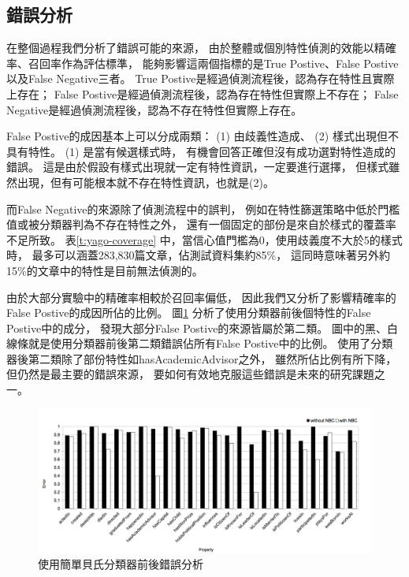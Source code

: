 \subsection{錯誤分析}

在整個過程我們分析了錯誤可能的來源，
由於整體或個別特性偵測的效能以精確率、召回率作為評估標準，
能夠影響這兩個指標的是True Postive、False Postive以及False Negative三者。
True Postive是經過偵測流程後，認為存在特性且實際上存在；
False Postive是經過偵測流程後，認為存在特性但實際上不存在；
False Negative是經過偵測流程後，認為不存在特性但實際上存在。

False Postive的成因基本上可以分成兩類：
(1) 由歧義性造成、 (2) 樣式出現但不具有特性。
(1) 是當有候選樣式時，
有機會回答正確但沒有成功選對特性造成的錯誤。
這是由於假設有樣式出現就一定有特性資訊，一定要進行選擇，
但樣式雖然出現，但有可能根本就不存在特性資訊，也就是(2)。

而False Negative的來源除了偵測流程中的誤判，
例如在特性篩選策略中低於門檻值或被分類器判為不存在特性之外，
還有一個固定的部份是來自於樣式的覆蓋率不足所致。
表\ref{t:yago-coverage} 中，當信心值門檻為0，使用歧義度不大於5的樣式時，
最多可以涵蓋283,830篇文章，佔測試資料集約85\%，
這同時意味著另外約15\%的文章中的特性是目前無法偵測的。

由於大部分實驗中的精確率相較於召回率偏低，
因此我們又分析了影響精確率的False Postive的成因所佔的比例。
圖\ref{i:error} 分析了使用分類器前後個特性的False Postive中的成分，
發現大部分False Postive的來源皆屬於第二類。
圖中的黑、白線條就是使用分類器前後第二類錯誤佔所有False Postive中的比例。
使用了分類器後第二類除了部份特性如hasAcademicAdvisor之外，
雖然所佔比例有所下降，但仍然是最主要的錯誤來源，
要如何有效地克服這些錯誤是未來的研究課題之一。

\begin{figure}[h]
    \centering
    \includegraphics[width=\textwidth]{images/04-error}
    \caption{使用簡單貝氏分類器前後錯誤分析}
    \label{i:error}
\end{figure}


